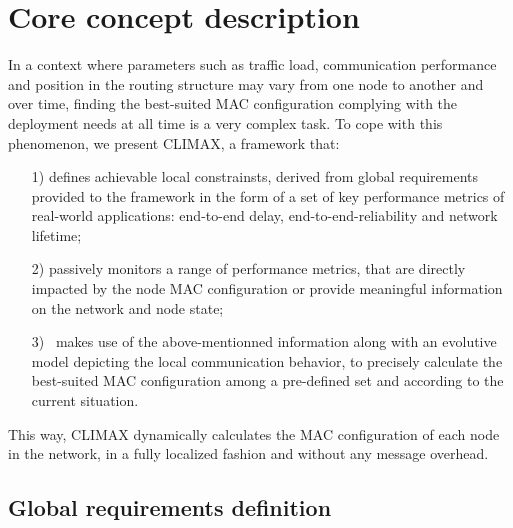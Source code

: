 \documentclass[12pt,journal,compsoc]{IEEEtran}
\begin{document}
\section{Core concept description}
\label{contrib}

In a context where parameters such as traffic load, communication performance and position in the routing structure may vary from one node to another and over time, finding the best-suited MAC configuration complying with the deployment needs at all time is a very complex task.
To cope with this phenomenon, we present CLIMAX, a framework that:

\begin{itemize}
	\item[1) ] defines achievable local constrainsts, derived from global requirements provided to the framework in the form of a set of key performance metrics of real-world applications: end-to-end delay, end-to-end-reliability and network lifetime;
	\item[2) ] passively monitors a range of performance metrics, that are directly impacted by the node MAC configuration or provide meaningful information on the network and node state;
	\item[3)] ~makes use of the above-mentionned information along with an evolutive model depicting the local communication behavior, to precisely calculate the best-suited MAC configuration among a pre-defined set and according to the current situation.
\end{itemize}

This way, CLIMAX dynamically calculates the MAC configuration of each node in the network, in a fully localized fashion and without any message overhead.


\subsection{Global requirements definition}
\end{document}
